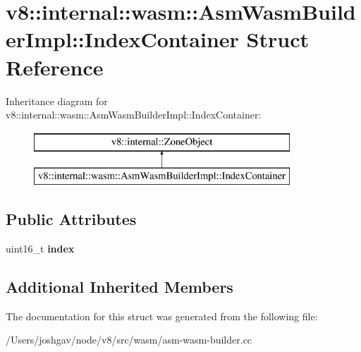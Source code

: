 \hypertarget{structv8_1_1internal_1_1wasm_1_1_asm_wasm_builder_impl_1_1_index_container}{}\section{v8\+:\+:internal\+:\+:wasm\+:\+:Asm\+Wasm\+Builder\+Impl\+:\+:Index\+Container Struct Reference}
\label{structv8_1_1internal_1_1wasm_1_1_asm_wasm_builder_impl_1_1_index_container}
Inheritance diagram for v8\+:\+:internal\+:\+:wasm\+:\+:Asm\+Wasm\+Builder\+Impl\+:\+:Index\+Container\+:\begin{figure}[H]
\begin{center}
\leavevmode
\includegraphics[height=2.000000cm]{structv8_1_1internal_1_1wasm_1_1_asm_wasm_builder_impl_1_1_index_container}
\end{center}
\end{figure}
\subsection*{Public Attributes}
\begin{DoxyCompactItemize}
\item 
uint16\+\_\+t {\bfseries index}\hypertarget{structv8_1_1internal_1_1wasm_1_1_asm_wasm_builder_impl_1_1_index_container_af30fa24ffac7a8fd440dd8abb8abed40}{}\label{structv8_1_1internal_1_1wasm_1_1_asm_wasm_builder_impl_1_1_index_container_af30fa24ffac7a8fd440dd8abb8abed40}

\end{DoxyCompactItemize}
\subsection*{Additional Inherited Members}


The documentation for this struct was generated from the following file\+:\begin{DoxyCompactItemize}
\item 
/\+Users/joshgav/node/v8/src/wasm/asm-\/wasm-\/builder.\+cc\end{DoxyCompactItemize}
